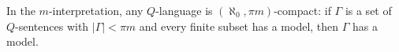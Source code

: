 In the $m$-interpretation, any $Q$-language is $(\aleph_0, \pi m)$-compact: if $\Gamma$ is a set of $Q$-sentences with $|\Gamma| < \pi m$ and every finite subset has a model, then $\Gamma$ has a model.
